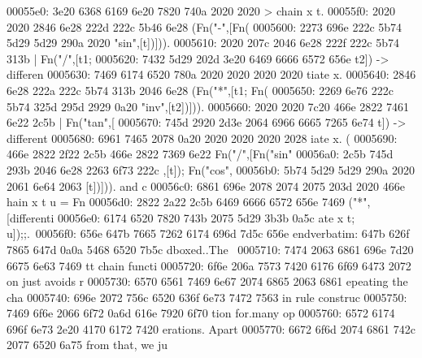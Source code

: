 \begin{bo
00010e0: 7865 647d 5c62 6567 696e 7b76 6572 6261  xed}
\begin{verba
00010f0: 7469 6d7d 0a20 2023 7479 7065 2074 6572  tim}
\begin{
0001c40: 7665 7262 6174 696d 7d0a 2020 236c 6574  verbatim}
\begin{boxe
00027a0: 647d 5c62 6567 696e 7b76 6572 6261 7469  d}
\begin{verbati
00027b0: 6d7d 0a20 2023 6c65 7420 696e 6669 7865  m}
\begin{v
0002c60: 6572 6261 7469 6d7d 0a20 2023 6c65 7420  erbatim}
\begin{
0002dc0: 7665 7262 6174 696d 7d0a 2020 236c 6574  verbatim}
\begin{boxed
0002f30: 7d5c 6265 6769 6e7b 7665 7262 6174 696d  }
\begin{verbatim
0002f40: 7d0a 2020 236c 6574 2068 6428 683a 3a74  }
\begin{v
0003e60: 6572 6261 7469 6d7d 0a20 2023 236f 7065  erbatim}
\begin{boxed
00042b0: 7d5c 6265 6769 6e7b 7665 7262 6174 696d  }
\begin{verbatim
00042c0: 7d0a 2020 2328 782c 7429 3b3b 0a20 202d  }
\begin{boxed}
\begin{boxed}
00055e0: 3e20 6368 6169 6e20 7820 740a 2020 2020  > chain x t.    
00055f0: 2020 2020 2846 6e28 222d 222c 5b46 6e28      (Fn("-",[Fn(
0005600: 2273 696e 222c 5b74 5d29 5d29 290a 2020  "sin",[t])])).  
0005610: 2020 207c 2046 6e28 222f 222c 5b74 313b     | Fn("/",[t1;
0005620: 7432 5d29 202d 3e20 6469 6666 6572 656e  t2]) -> differen
0005630: 7469 6174 6520 780a 2020 2020 2020 2020  tiate x.        
0005640: 2846 6e28 222a 222c 5b74 313b 2046 6e28  (Fn("*",[t1; Fn(
0005650: 2269 6e76 222c 5b74 325d 295d 2929 0a20  "inv",[t2])])). 
0005660: 2020 2020 7c20 466e 2822 7461 6e22 2c5b      | Fn("tan",[
0005670: 745d 2920 2d3e 2064 6966 6665 7265 6e74  t]) -> different
0005680: 6961 7465 2078 0a20 2020 2020 2020 2028  iate x.        (
0005690: 466e 2822 2f22 2c5b 466e 2822 7369 6e22  Fn("/",[Fn("sin"
00056a0: 2c5b 745d 293b 2046 6e28 2263 6f73 222c  ,[t]); Fn("cos",
00056b0: 5b74 5d29 5d29 290a 2020 2061 6e64 2063  [t])])).   and c
00056c0: 6861 696e 2078 2074 2075 203d 2020 466e  hain x t u =  Fn
00056d0: 2822 2a22 2c5b 6469 6666 6572 656e 7469  ("*",[differenti
00056e0: 6174 6520 7820 743b 2075 5d29 3b3b 0a5c  ate x t; u]);;.\
00056f0: 656e 647b 7665 7262 6174 696d 7d5c 656e  end{verbatim}\en
0005700: 647b 626f 7865 647d 0a0a 5468 6520 7b5c  d{boxed}..The {\
0005710: 7474 2063 6861 696e 7d20 6675 6e63 7469  tt chain} functi
0005720: 6f6e 206a 7573 7420 6176 6f69 6473 2072  on just avoids r
0005730: 6570 6561 7469 6e67 2074 6865 2063 6861  epeating the cha
0005740: 696e 2072 756c 6520 636f 6e73 7472 7563  in rule construc
0005750: 7469 6f6e 2066 6f72 0a6d 616e 7920 6f70  tion for.many op
0005760: 6572 6174 696f 6e73 2e20 4170 6172 7420  erations. Apart 
0005770: 6672 6f6d 2074 6861 742c 2077 6520 6a75  from that, we ju

\end{boxed}
\end{boxed}
\end{verbatim
00042c0: 7d0a 2020 2328 782c 7429 3b3b 0a20 202d  }
\end{boxed
00042b0: 7d5c 6265 6769 6e7b 7665 7262 6174 696d  }
\end{v
0003e60: 6572 6261 7469 6d7d 0a20 2023 236f 7065  erbatim}
\end{verbatim
0002f40: 7d0a 2020 236c 6574 2068 6428 683a 3a74  }
\end{boxed
0002f30: 7d5c 6265 6769 6e7b 7665 7262 6174 696d  }
\end{
0002dc0: 7665 7262 6174 696d 7d0a 2020 236c 6574  verbatim}
\end{v
0002c60: 6572 6261 7469 6d7d 0a20 2023 6c65 7420  erbatim}
\end{verbati
00027b0: 6d7d 0a20 2023 6c65 7420 696e 6669 7865  m}
\end{boxe
00027a0: 647d 5c62 6567 696e 7b76 6572 6261 7469  d}
\end{
0001c40: 7665 7262 6174 696d 7d0a 2020 236c 6574  verbatim}
\end{verba
00010f0: 7469 6d7d 0a20 2023 7479 7065 2074 6572  tim}
\end{bo
00010e0: 7865 647d 5c62 6567 696e 7b76 6572 6261  xed}
